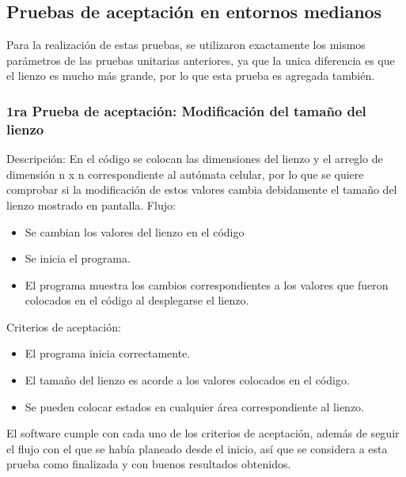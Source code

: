\subsection{Pruebas de aceptaci\'on en entornos medianos}
    Para la realizaci\'on de estas pruebas, se utilizaron
        exactamente los mismos par\'ametros de las pruebas unitarias
        anteriores, ya que la unica diferencia es que el lienzo es
        mucho m\'as grande, por lo que esta prueba es agregada
        tambi\'en.
        \vskip 0.5cm
    \subsubsection{1ra Prueba de aceptaci\'on: Modificaci\'on del tama\~no del lienzo}
    Descripci\'on: En el c\'odigo se colocan las dimensiones del
        lienzo y el arreglo de dimensi\'on n x n correspondiente al
        aut\'omata celular, por lo que se quiere comprobar si la
        modificaci\'on de estos valores cambia debidamente el
        tama\~no del lienzo mostrado en pantalla.
    \vskip 0.5cm
    Flujo:
    \vskip 0.5cm
    \begin{itemize}
        \item Se cambian los valores del lienzo en el c\'odigo
        \item Se inicia el programa.
        \item El programa muestra los cambios correspondientes a los
        valores que fueron colocados en el c\'odigo al
        desplegarse el lienzo.
    \end{itemize}
    \vskip 0.5cm
    Criterios de aceptaci\'on:
    \begin{itemize}
        \item El programa inicia correctamente.
        \item El tama\~no del lienzo es acorde a los valores colocados
        en el c\'odigo.
        \item Se pueden colocar estados en cualquier \'area
        correspondiente al lienzo.
    \end{itemize}
    \vskip 0.5cm
    El software cumple con cada uno de los criterios de
        aceptaci\'on, adem\'as de seguir el flujo con el que se hab\'ia
        planeado desde el inicio, as\'i que se considera a esta prueba
        como finalizada y con buenos resultados obtenidos.
